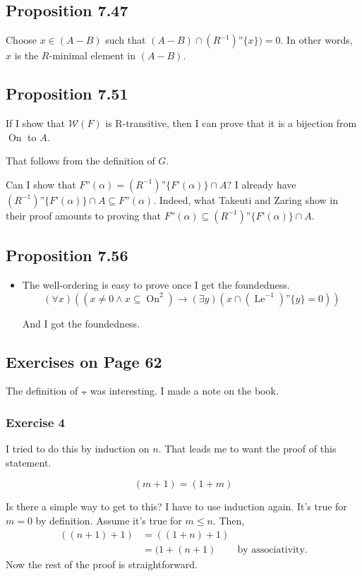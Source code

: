 \documentclass{article}
\DeclareMathOperator{\On}{On}
\DeclareMathOperator{\Le}{Le}
\newcommand{\RelationLessThan}[2]{(#1^{-1})\text{''}\{#2\}}
\newcommand{\RLessThan}[1]{\RelationLessThan{R}{#1}}
\begin{document}
\subsection{Proposition 7.47}
Choose \(x \in (A - B)\) such that \((A - B) \cap \RLessThan{x}) = 0\). In other
words, \(x\) is the \(R\)-minimal element in \((A - B)\).

\subsection{Proposition 7.51}
If I show that \(\mathscr{W}(F)\) is R-transitive, then I can prove that it is a
bijection from \(\On\) to \(A\).

That follows from the definition of \(G\).

Can I show that \(F\text{''}(\alpha) = \RLessThan{F\text{'}(\alpha)} \cap A\)? I
already have \(\RLessThan{F\text{'}(\alpha)} \cap A \subseteq
F\text{''}(\alpha)\). Indeed, what Takeuti and Zaring show in
their proof amounts to proving that \(F\text{''}(\alpha) \subseteq
\RLessThan{F\text{'}(\alpha)} \cap A\).

\subsection{Proposition 7.56}
\begin{itemize}
  \item The well-ordering is easy to prove once I get the foundedness.
    \[
      (\forall x) ((x \neq 0 \wedge x \subseteq \On^2) \rightarrow
          (\exists y)(x \cap \RelationLessThan{\Le}{y} = 0))
    \]

  And I got the foundedness.
\end{itemize}

\subsection{Exercises on Page 62}
The definition of \(\minusdot\) was interesting. I made a note on the book.

\subsubsection{Exercise 4}
I tried to do this by induction on \(n\). That leads me to want the proof of
this statement.

\[
  (m + 1) = (1 + m)
\]

Is there a simple way to get to this? I have to use induction again. It's true
for \(m = 0\) by definition. Assume it's true for \(m \le n\). Then,
\begin{align*}
  ((n + 1) + 1) &= ((1 + n) + 1) \\
                &= (1 + (n + 1) &\text{by associativity.}
\end{align*}
Now the rest of the proof is straightforward.
\end{document}
